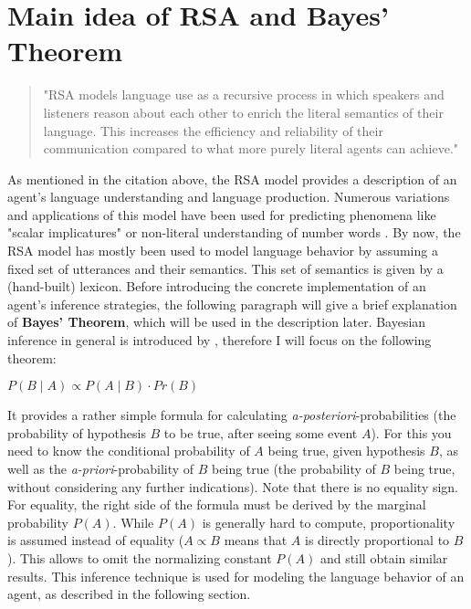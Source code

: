 \section{Main idea of RSA and Bayes' Theorem}
\begin{quote}
"RSA models language use as a recursive process in which
speakers and listeners reason about each other to enrich the literal semantics of their language.
This increases the efficiency and reliability of their communication compared to what more
purely literal agents can achieve." \citep{monroe2015learning}
\end{quote}
As mentioned in the citation above, the RSA model provides a description of an agent's language understanding and language production.
Numerous variations and applications of this model have been used for predicting phenomena like "scalar implicatures" or non-literal understanding of number words \citep[see][]{goodman2013knowledge, kao2014nonliteral}. By now, the RSA model has mostly been used to model language behavior by assuming a fixed set of utterances and their semantics. This set of semantics is given by a (hand-built) lexicon. Before introducing the concrete implementation of an agent's inference strategies, the following paragraph will give a brief explanation of \textbf{Bayes' Theorem}, which will be used in the description later.
Bayesian inference in general is introduced by \cite{lassiter2017adjectival}, 
therefore I will focus on the following theorem:
\begin{theorem}
$P(B \mid A) \propto P(A \mid B) \cdot Pr(B)$
\end{theorem}
It provides a rather simple formula for calculating \textit{a-posteriori}-probabilities (the probability of hypothesis $B$ to be true, after seeing some event $A$). For this you need to know the conditional probability of $A$ being true, given hypothesis $B$, as well as the \textit{a-priori}-probability of $B$ being true (the probability of $B$ being true, without considering any further indications). Note that there is no equality sign. For equality, the right side of the formula must be derived by the marginal probability $P(A)$. While $P(A)$ is generally hard to compute, proportionality is assumed instead of equality ($A \propto B$ means that $A$ is directly proportional to $B$). This allows to omit the normalizing constant $P(A)$ and still obtain similar results. This inference technique is used for modeling the language behavior of an agent, as described in the following section.

